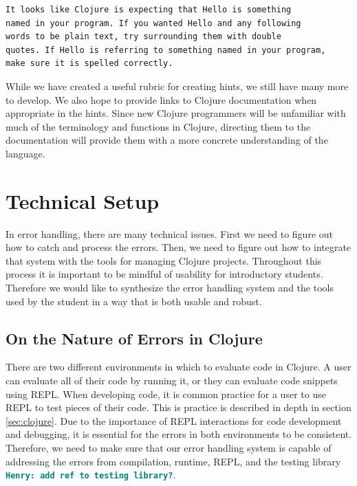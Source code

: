 \documentclass[12pt]{article}
\newcommand{\comment}[1]{{\bf \tt  {#1}}}
\newcommand{\emcomment}[1]{\textcolor{ForestGreen}{\comment{Elena: {#1}}}}
\newcommand{\hfcomment}[1]{\textcolor{Teal}{\comment{Henry: {#1}}}}
\begin{document}
\begin{verbatim}
It looks like Clojure is expecting that Hello is something
named in your program. If you wanted Hello and any following
words to be plain text, try surrounding them with double
quotes. If Hello is referring to something named in your program,
make sure it is spelled correctly.
\end{verbatim}

While we have created a useful rubric for creating hints, we still have many more to develop.
We also hope to provide links to Clojure documentation when appropriate in the hints.
Since new Clojure programmers will be unfamiliar with much of the terminology and functions in Clojure, directing them to the documentation will provide them with a more concrete understanding of the language.

\section{Technical Setup}\label{sec:technical}
In error handling, there are many technical issues. First we need to figure out how to catch and process the errors. Then, we need to figure out how to integrate that system with the tools for managing Clojure projects. Throughout this process it is important to be mindful of usability for introductory students. Therefore we would like to synthesize the error handling system and the tools used by the student in a way that is both usable and robust.


\subsection{On the Nature of Errors in Clojure}


There are two different environments in which to evaluate code in Clojure. A user can evaluate all of their code by running it, or they can evaluate code snippets using REPL. When developing code, it is common practice for a user to use REPL to test pieces of their code. This is practice is described in depth in section \ref{sec:clojure}. Due to the importance of REPL interactions for code development and debugging, it is essential for the errors in both environments to be consistent. Therefore, we need to make sure that our error handling system is capable of addressing the errors from compilation, runtime,  REPL, and the testing library \hfcomment{add ref to testing library?}.
\end{document}

